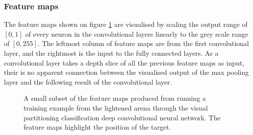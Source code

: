 %
%


\subsubsection{Feature maps}
The feature maps shown on figure \ref{fig:featuremaps} are visualised by scaling the output range of $[0,1]$ of every neuron in the convolutional layers linearly to the grey scale range of $[0,255]$. The leftmost column of feature maps are from the first convolutional layer, and the rightmost is the input to the fully connected layers. As a convolutional layer takes a depth slice of all the previous feature maps as input, their is no apparent connection between the visualised output of the max pooling layer and the following result of the convolutional layer.

\begin{figure}[H]
	\begin{scriptsize}
		\sffamily
		\def\svgwidth{\textwidth}
		
	\end{scriptsize}
	\caption[Feature maps]{A small subset of the feature maps produced from running a training example from the lightened arena through the visual partitioning classification deep convolutional neural network. The feature maps highlight the position of the target.}
	\label{fig:featuremaps}
\end{figure}































































